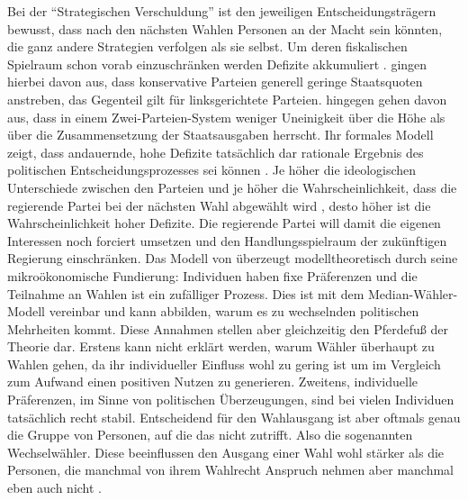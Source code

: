Bei der "`Strategischen Verschuldung"' ist den jeweiligen Entscheidungsträgern bewusst, dass nach den nächsten Wahlen Personen an der Macht sein könnten, die ganz andere Strategien verfolgen als sie selbst. Um deren fiskalischen Spielraum schon vorab einzuschränken werden Defizite akkumuliert \parencite[S. 681]{Romer2019}. \textcite{Persson1989} gingen hierbei davon aus, dass konservative Parteien generell geringe Staatsquoten anstreben, das Gegenteil gilt für linksgerichtete Parteien. \textcite{Alesina1990} hingegen gehen davon aus, dass in einem Zwei-Parteien-System weniger Uneinigkeit über die Höhe als über die Zusammensetzung der Staatsausgaben herrscht. Ihr formales Modell zeigt, dass andauernde, hohe Defizite tatsächlich dar rationale Ergebnis des politischen Entscheidungsprozesses sei können \parencite[S. 403]{Alesina1990}. Je höher die ideologischen Unterschiede zwischen den Parteien \parencite[S. 413]{Alesina1990} und je höher die Wahrscheinlichkeit, dass die regierende Partei bei der nächsten Wahl abgewählt wird \parencite[S. 410]{Alesina1990}, desto höher ist die Wahrscheinlichkeit hoher Defizite. Die regierende Partei will damit die eigenen Interessen noch forciert umsetzen und den Handlungsspielraum der zukünftigen Regierung einschränken. Das Modell von \textcite{Alesina1990} überzeugt modelltheoretisch durch seine mikroökonomische Fundierung: Individuen haben fixe Präferenzen und die Teilnahme an Wahlen ist ein zufälliger Prozess. Dies ist mit dem Median-Wähler-Modell vereinbar und kann abbilden, warum es zu wechselnden politischen Mehrheiten kommt. Diese Annahmen stellen aber gleichzeitig den Pferdefuß der Theorie dar. Erstens kann nicht erklärt werden, warum Wähler überhaupt zu Wahlen gehen, da ihr individueller Einfluss wohl zu gering ist um im Vergleich zum Aufwand einen positiven Nutzen zu generieren. Zweitens, individuelle Präferenzen, im Sinne von politischen Überzeugungen, sind bei vielen Individuen tatsächlich recht stabil. Entscheidend für den Wahlausgang ist aber oftmals genau die Gruppe von Personen, auf die das nicht zutrifft. Also die sogenannten Wechselwähler. Diese beeinflussen den Ausgang einer Wahl wohl stärker als die Personen, die manchmal von ihrem Wahlrecht Anspruch nehmen aber manchmal eben auch nicht \parencite[S. 687]{Romer2019}. 

